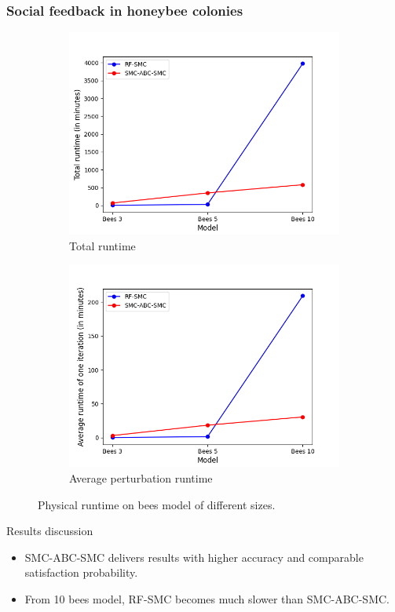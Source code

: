 \documentclass{beamer}
\begin{document}
\begin{frame}
    \frametitle{Social feedback in honeybee colonies}
    \begin{figure}[H]
        \centering
        \begin{subfigure}{0.3\textwidth}
            \centering
            \includegraphics[width=\linewidth]{figures/bees_runtime_total.png}
            \caption{Total runtime}
        \end{subfigure}
        \hfill
        \begin{subfigure}{0.3\textwidth}
            \centering
            \includegraphics[width=\linewidth]{figures/bees_runtime_avg.png}
            \caption{Average perturbation runtime}
        \end{subfigure}
        \caption{Physical runtime on bees model of different sizes.}
    \end{figure}
    Results discussion
    \begin{itemize}
        \item SMC-ABC-SMC delivers results with higher accuracy and comparable satisfaction probability.
        \item From 10 bees model, RF-SMC becomes much slower than SMC-ABC-SMC.
    \end{itemize}
\end{frame}
\end{document}
